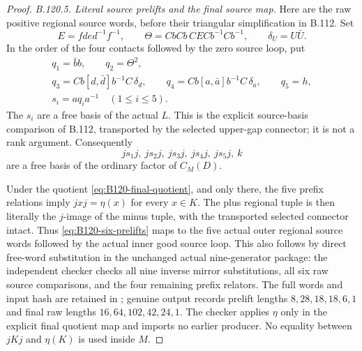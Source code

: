 \begin{proof}
\emph{B.120.5. Literal source prelifts and the final source map.}
Here are the raw positive regional source words, before their
triangular simplification in B.112. Set
\[
 E=fde d^{-1}f^{-1},\qquad
 \Theta=CbCb\,CECb^{-1}Cb^{-1},\qquad \delta_U=U\bar U.
\]
In the order of the four contacts followed by the zero source loop,
put
\begin{equation}\label{eq:B120-raw-source}
 \begin{gathered}
 q_1=\bar b b,\qquad q_2=\Theta^2,\\
 q_3=Cb[d,\bar d]b^{-1}C\,\delta_d,\qquad
 q_4=Cb[a,\bar a]b^{-1}C\,\delta_a,\qquad q_5=h,\\
 s_i=a q_i a^{-1}\quad(1\leq i\leq5).
 \end{gathered}
\end{equation}
The $s_i$ are a free basis of the actual $L$. This is the explicit
source-basis comparison of B.112, transported by the selected
upper-gap connector; it is not a rank argument. Consequently
\begin{equation}\label{eq:B120-six-prelifts}
 js_1j,\ js_2j,\ js_3j,\ js_4j,\ js_5j,\ k
\end{equation}
are a free basis of the ordinary factor of $C_M(D)$.

Under the quotient \eqref{eq:B120-final-quotient}, and only there,
the five prefix relations imply $jxj=\eta(x)$ for every $x\in K$.
The plus regional tuple is then literally the $j$-image of the
minus tuple, with the transported selected connector intact.
Thus \eqref{eq:B120-six-prelifts} maps to the five actual outer
regional source words followed by the actual inner good source
loop. This also follows by direct free-word substitution in the
unchanged actual nine-generator package: the independent checker
checks all nine inverse mirror substitutions, all six raw source
comparisons, and the four remaining prefix relators. The full
words and input hash are retained in
; genuine output
records prelift lengths $8,28,18,18,6,1$ and final raw lengths
$16,64,102,42,24,1$. The checker applies $\eta$ only in the
explicit final quotient map and imports no earlier producer.
No equality between $jKj$ and $\eta(K)$ is used inside $M$.


\end{proof}
